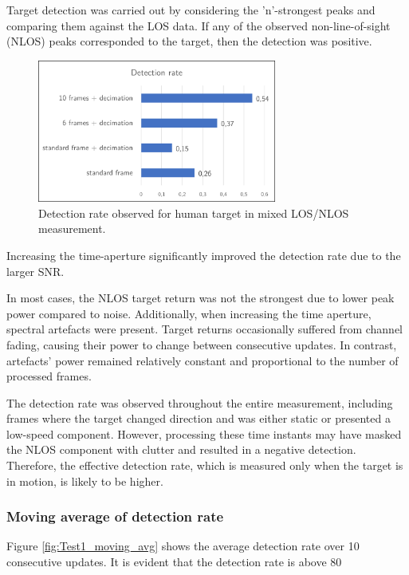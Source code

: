 



Target detection was carried out by considering the 'n'-strongest peaks and comparing them against the LOS data. If any of the observed non-line-of-sight (NLOS) peaks corresponded to the target, then the detection was positive.

\begin{figure}[H]
	\centering
	\includegraphics[width=0.7\textwidth]{Images/Test1/detect_hist.png}
	\caption{Detection rate observed for human target in mixed LOS/NLOS measurement.}
	\label{fig:Test1_detect_hist}
\end{figure}

Increasing the time-aperture significantly improved the detection rate due to the larger SNR.

In most cases, the NLOS target return was not the strongest due to lower peak power compared to noise. Additionally, when increasing the time aperture, spectral artefacts were present.
Target returns occasionally suffered from channel fading, causing their power to change between consecutive updates. In contrast, artefacts' power remained relatively constant and proportional to the number of processed frames.

The detection rate was observed throughout the entire measurement, including frames where the target changed direction and was either static or presented a low-speed component. However, processing these time instants may have masked the NLOS component with clutter and resulted in a negative detection. Therefore, the effective detection rate, which is measured only when the target is in motion, is likely to be higher.


\subsubsection{Moving average of detection rate}

Figure \ref{fig:Test1_moving_avg} shows the average detection rate over 10 consecutive updates. It is evident that the detection rate is above 80%



